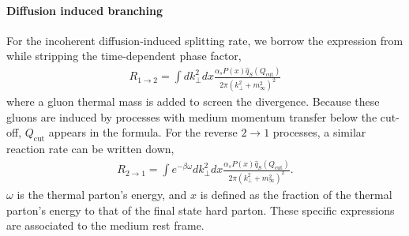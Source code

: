 \paragraph{Diffusion induced branching} For the incoherent diffusion-induced splitting rate, we borrow the expression from \cite{Cao:2017hhk} while stripping the time-dependent phase factor,
\begin{eqnarray}
R_{1\rightarrow 2} = \int d k_\perp^2 dx \frac{\alpha_s P(x) \hat{q}_S(Q_{\textrm{cut}})}{2\pi (k_\perp^2 + m_\infty^2)^2}
\end{eqnarray}
where a gluon thermal mass is added to screen the divergence.
Because these gluons are induced by processes with medium momentum transfer below the cut-off, $Q_{\textrm{cut}}$ appears in the formula.
For the reverse $2\rightarrow 1$ processes, a similar reaction rate can be written down,
\begin{eqnarray}
R_{2\rightarrow 1} = \int e^{-\beta \omega} d k_\perp^2 dx \frac{\alpha_s P(x) \hat{q}_S(Q_{\textrm{cut}})}{2\pi (k_\perp^2 + m_\infty^2)^2}.
\end{eqnarray}
$\omega$ is the thermal parton's energy, and $x$ is defined as the fraction of the thermal parton's energy to that of the final state hard parton.
These specific expressions are associated to the medium rest frame.

